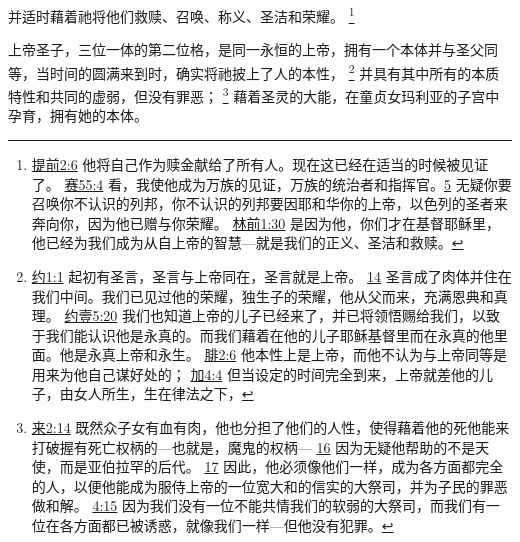 \documentclass[12pt, a4paper, oneside]{ctexart}
\newcounter{parnum}[section]
\newcommand{\N}{%
   \noindent\refstepcounter{parnum}%
    \makebox[\parindent][l]{\textbf{\arabic{parnum}.}}}
\begin{document}
	并适时藉着祂将他们救赎、召唤、称义、圣洁和荣耀。
	\footnote {
		\href{https://biblehub.com/1_timothy/2-6.htm}{提前2:6} 他将自己作为赎金献给了所有人。现在这已经在适当的时候被见证了。
		\href{https://biblehub.com/isaiah/55-4.htm}{赛55:4} 看，我使他成为万族的见证，万族的统治者和指挥官。\href{https://biblehub.com/isaiah/55-5.htm}{5} 无疑你要召唤你不认识的列邦，你不认识的列邦要因耶和华你的上帝，以色列的圣者来奔向你，因为他已赠与你荣耀。
		\href{https://biblehub.com/1_corinthians/1-30.htm}{林前1:30} 是因为他，你们才在基督耶稣里，他已经为我们成为从自上帝的智慧---就是我们的正义、圣洁和救赎。
	}

\N 上帝圣子，三位一体的第二位格，是同一永恒的上帝，拥有一个本体并与圣父同等，当时间的圆满来到时，确实将祂披上了人的本性，
	\footnote {
		\href{https://biblehub.com/john/1-1.htm}{约1:1} 起初有圣言，圣言与上帝同在，圣言就是上帝。
		\href{https://biblehub.com/john/1-14.htm}{14} 圣言成了肉体并住在我们中间。我们已见过他的荣耀，独生子的荣耀，他从父而来，充满恩典和真理。
		\href{https://biblehub.com/1_john/5-20.htm}{约壹5:20} 我们也知道上帝的儿子已经来了，并已将领悟赐给我们，以致于我们能认识他是永真的。而我们藉着在他的儿子耶稣基督里而在永真的他里面。他是永真上帝和永生。
		\href{https://biblehub.com/philippians/2-6.htm}{腓2:6} 他本性上是上帝，而他不认为与上帝同等是用来为他自己谋好处的；
		\href{https://biblehub.com/galatians/4-4.htm}{加4:4} 但当设定的时间完全到来，上帝就差他的儿子，由女人所生，生在律法之下，
	}
	并具有其中所有的本质特性和共同的虚弱，但没有罪恶；
	\footnote {
		\href{https://biblehub.com/hebrews/2-14.htm}{来2:14} 既然众子女有血有肉，他也分担了他们的人性，使得藉着他的死他能来打破握有死亡权柄的---也就是，魔鬼的权柄---
		\href{https://biblehub.com/hebrews/2-16.htm}{16} 因为无疑他帮助的不是天使，而是亚伯拉罕的后代。
		\href{https://biblehub.com/hebrews/2-17.htm}{17} 因此，他必须像他们一样，成为各方面都完全的人，以便他能成为服侍上帝的一位宽大和的信实的大祭司，并为子民的罪恶做和解。
		\href{https://biblehub.com/hebrews/4-15.htm}{4:15} 因为我们没有一位不能共情我们的软弱的大祭司，而我们有一位在各方面都已被诱惑，就像我们一样---但他没有犯罪。
	}
	藉着圣灵的大能，在童贞女玛利亚的子宫中孕育，拥有她的本体。
\end{document}
